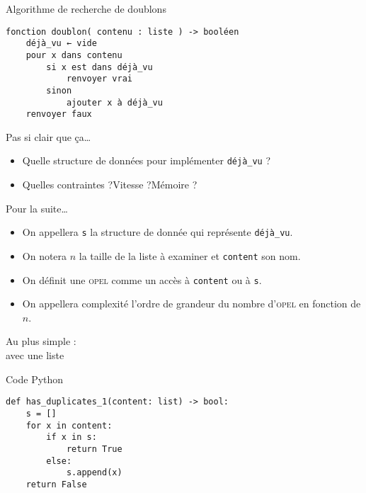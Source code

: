 \documentclass[12pt]{nsibeamer}
\begin{document}
%

\begin{frame}[fragile]{Algorithme de recherche de doublons}
\begin{verbatim}
fonction doublon( contenu : liste ) -> booléen
    déjà_vu ← vide
    pour x dans contenu
        si x est dans déjà_vu
            renvoyer vrai
        sinon
            ajouter x à déjà_vu
    renvoyer faux
\end{verbatim}
\end{frame}

%

\begin{frame}[fragile]{Pas si clair que ça\ldots}
\pause
\begin{itemize}
	\item Quelle structure de données pour implémenter \texttt{déjà\_vu} ?\pause
	\item Quelles contraintes ?\pause Vitesse ?\pause Mémoire ? 	
\end{itemize}
\end{frame}

%

\begin{frame}[fragile]{Pour la suite\ldots}
\pause
\begin{itemize}
	\item On appellera \texttt{s} la structure de donnée qui représente \texttt{déjà\_vu}.\pause
	\item On notera $n$ la taille de la liste à examiner et \texttt{content} son nom.\pause
	\item On définit une \textsc{opel} comme un accès à \texttt{content} ou à \texttt{s}.\pause
	\item On appellera complexité l'ordre de grandeur du nombre d'\textsc{opel} en fonction de $n$.
\end{itemize}
\end{frame}

%

\begin{frame}[standout]
	\begin{center}
		\Huge
		Au plus simple :\\\pause
		avec une liste
		\normalsize
	\end{center}
\end{frame}

%

\begin{frame}[fragile]{Code Python}
\begin{verbatim}
def has_duplicates_1(content: list) -> bool:
    s = []
    for x in content:
        if x in s:
            return True
        else:
            s.append(x)
    return False
\end{verbatim}
\end{frame}
\end{document}
